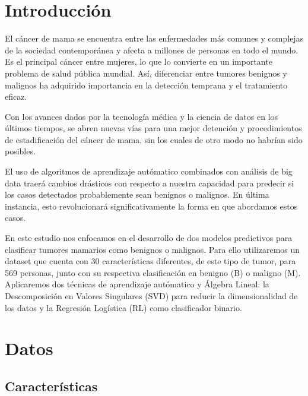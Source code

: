 \documentclass[a4paper,10pt,twocolumn]{article}
\begin{document}
\section{Introducción}\label{sec:intro}
  El cáncer de mama se encuentra entre las enfermedades más comunes y complejas de la sociedad contemporánea y afecta a millones de personas en todo el mundo. Es el principal cáncer entre mujeres, lo que lo convierte en un importante problema de salud pública mundial. Así, diferenciar entre tumores benignos y malignos ha adquirido importancia en la detección temprana y el tratamiento eficaz.

Con los avances dados por la tecnología médica y la ciencia de datos en los últimos tiempos, se abren nuevas vías para una mejor detención y procedimientos de estadificación del cáncer de mama, sin los cuales de otro modo no habrían sido posibles.

El uso de algoritmos de aprendizaje autómatico combinados con análisis de big data traerá cambios drásticos con respecto a nuestra capacidad para predecir si los casos detectados probablemente sean benignos o malignos. En última instancia, esto revolucionará significativamente la forma en que abordamos estos casos.

En este estudio nos enfocamos en el desarrollo de dos modelos predictivos para clasificar tumores mamarios como benignos o malignos. Para ello utilizaremos un dataset que cuenta con 30 características diferentes, de este tipo de tumor, para 569 personas, junto con su respectiva clasificación en benigno (B) o maligno (M). Aplicaremos dos técnicas de aprendizaje autómatico y Álgebra Lineal: la Descomposición en Valores Singulares (SVD) para reducir la dimensionalidad de los datos y la Regresión Logística (RL) como clasificador binario.




\section{Datos}\label{sec:dev}
\subsection{Características}
\end{document}
